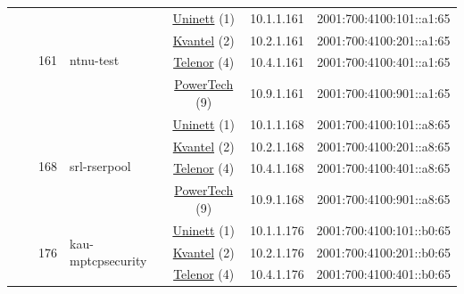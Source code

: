 \begin{small}
\begin{center}
\begin{longtable}{|c|c|c|c|c|c|c|c|}
  &  & \multirow{4}{*}{\tiny{161}} & \multicolumn{1}{|l|}{\multirow{4}{*}{\tiny{ntnu-test}}} & \multicolumn{2}{|c|}{\tiny{\href{https://www.uninett.no}{Uninett} (1)}} & \tiny{10.1.1.161} & \tiny{2001:700:4100:101::a1:65} \\* \cline{5-5}\cline{6-6}\cline{7-7}\cline{8-8}
  &  &  &  & \multicolumn{2}{|c|}{\tiny{\href{http://kvantel.no}{Kvantel} (2)}} & \tiny{10.2.1.161} & \tiny{2001:700:4100:201::a1:65} \\* \cline{5-5}\cline{6-6}\cline{7-7}\cline{8-8}
  &  &  &  & \multicolumn{2}{|c|}{\tiny{\href{https://www.telenor.no}{Telenor} (4)}} & \tiny{10.4.1.161} & \tiny{2001:700:4100:401::a1:65} \\* \cline{5-5}\cline{6-6}\cline{7-7}\cline{8-8}
  &  &  &  & \multicolumn{2}{|c|}{\tiny{\href{http://www.powertech.no}{PowerTech} (9)}} & \tiny{10.9.1.161} & \tiny{2001:700:4100:901::a1:65} \\* \cline{3-3}\cline{4-4}\cline{5-5}\cline{6-6}\cline{7-7}\cline{8-8}
  &  & \multirow{4}{*}{\tiny{168}} & \multicolumn{1}{|l|}{\multirow{4}{*}{\tiny{srl-rserpool}}} & \multicolumn{2}{|c|}{\tiny{\href{https://www.uninett.no}{Uninett} (1)}} & \tiny{10.1.1.168} & \tiny{2001:700:4100:101::a8:65} \\* \cline{5-5}\cline{6-6}\cline{7-7}\cline{8-8}
  &  &  &  & \multicolumn{2}{|c|}{\tiny{\href{http://kvantel.no}{Kvantel} (2)}} & \tiny{10.2.1.168} & \tiny{2001:700:4100:201::a8:65} \\* \cline{5-5}\cline{6-6}\cline{7-7}\cline{8-8}
  &  &  &  & \multicolumn{2}{|c|}{\tiny{\href{https://www.telenor.no}{Telenor} (4)}} & \tiny{10.4.1.168} & \tiny{2001:700:4100:401::a8:65} \\* \cline{5-5}\cline{6-6}\cline{7-7}\cline{8-8}
  &  &  &  & \multicolumn{2}{|c|}{\tiny{\href{http://www.powertech.no}{PowerTech} (9)}} & \tiny{10.9.1.168} & \tiny{2001:700:4100:901::a8:65} \\* \cline{3-3}\cline{4-4}\cline{5-5}\cline{6-6}\cline{7-7}\cline{8-8}
  &  & \multirow{4}{*}{\tiny{176}} & \multicolumn{1}{|l|}{\multirow{4}{*}{\tiny{kau-mptcpsecurity}}} & \multicolumn{2}{|c|}{\tiny{\href{https://www.uninett.no}{Uninett} (1)}} & \tiny{10.1.1.176} & \tiny{2001:700:4100:101::b0:65} \\* \cline{5-5}\cline{6-6}\cline{7-7}\cline{8-8}
  &  &  &  & \multicolumn{2}{|c|}{\tiny{\href{http://kvantel.no}{Kvantel} (2)}} & \tiny{10.2.1.176} & \tiny{2001:700:4100:201::b0:65} \\* \cline{5-5}\cline{6-6}\cline{7-7}\cline{8-8}
  &  &  &  & \multicolumn{2}{|c|}{\tiny{\href{https://www.telenor.no}{Telenor} (4)}} & \tiny{10.4.1.176} & \tiny{2001:700:4100:401::b0:65} \\* \cline{5-5}\cline{6-6}\cline{7-7}\cline{8-8}

\end{longtable}
\end{center}
\end{small}
